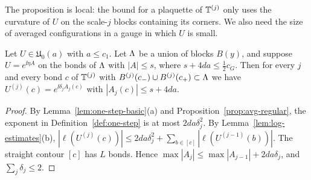 The proposition is local: the bound for a plaquette of $\mathbb T^{(j)}$ only uses the curvature of $U$ on the scale-$j$ blocks containing its corners. We also need the size of averaged configurations in a gauge in which $U$ is small.

\begin{lemma}\label{lem:avg-local-gauge}
Let $U\in\mathfrak U_0(a)$ with $a\le c_1$. Let $\Lambda$ be a union of blocks $B(y)$, and suppose $U=e^{\ii\eta A}$ on the bonds of $\Lambda$ with $|A|\le s$, where $s+4da\le\frac12c_G$. Then for every $j$ and every bond $c$ of $\mathbb T^{(j)}$ with $B^{(j)}(c_-)\cup B^{(j)}(c_+)\subset\Lambda$ we have $U^{(j)}(c)=e^{\ii\delta_jA_j(c)}$ with $|A_j(c)|\le s+4da$.
\end{lemma}

\begin{proof}
By Lemma~\ref{lem:one-step-basic}(a) and Proposition~\ref{prop:avg-regular}, the exponent in Definition~\ref{def:one-step} is at most $2da\delta_j^2$. By Lemma~\ref{lem:log-estimates}(b), $|\ell(U^{(j)}(c))|\le2da\delta_j^2+\sum_{b\in[c]}|\ell(U^{(j-1)}(b))|$. The straight contour $[c]$ has $L$ bonds. Hence $\max|A_j|\le\max|A_{j-1}|+2da\delta_j$, and $\sum_j\delta_j\le2$.
\end{proof}
